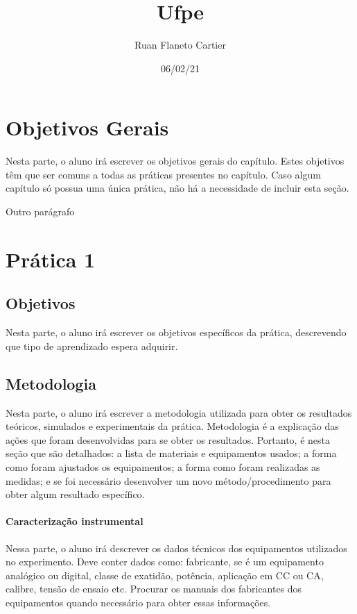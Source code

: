 \documentclass[12pt]{article}
\author{Ruan Flaneto Cartier}
\date{06/02/21}
\title{Ufpe}
\begin{document}
\maketitle



\section{Objetivos Gerais}
\label{sec:orgb857a6f}

Nesta parte, o aluno irá escrever os objetivos gerais do capítulo. Estes objetivos têm que ser comuns a todas as práticas presentes no capítulo. Caso algum capítulo só possua uma única prática, não há a necessidade de incluir esta seção.

Outro parágrafo
\section{Prática 1}
\label{sec:org1c56529}
\subsection{Objetivos}
\label{sec:org0f89133}

Nesta parte, o aluno irá escrever os objetivos específicos da prática, descrevendo que tipo de aprendizado espera adquirir.

\subsection{Metodologia}
\label{sec:org29020f3}
Nesta parte, o aluno irá escrever a metodologia utilizada para obter os resultados teóricos, simulados e experimentais da prática. Metodologia é a explicação das ações que foram desenvolvidas para se obter os resultados. Portanto, é nesta seção que são detalhados: a lista de materiais e equipamentos usados; a forma como foram ajustados os equipamentos; a forma como foram realizadas as medidas; e se foi necessário desenvolver um novo método/procedimento para obter algum resultado específico.

\paragraph{Caracterização instrumental}
Nessa parte, o aluno irá descrever os dados técnicos dos equipamentos utilizados no experimento. Deve conter dados como: fabricante, se é um equipamento analógico ou digital, classe de exatidão, potência, aplicação em CC ou CA, calibre, tensão de ensaio etc. Procurar os manuais dos fabricantes dos equipamentos quando necessário para obter essas informações.
\end{document}
